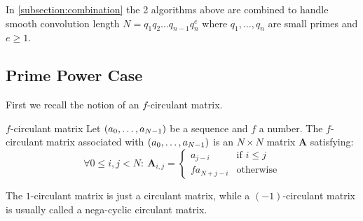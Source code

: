 In \cref{subsection:combination} the 2 algorithms above are combined to handle smooth convolution length \(N = q_1 q_2 \ldots q_{n-1} q_n^e\) where \(q_1, \ldots, q_n\) are small primes and \(e \ge 1\).

\subsection{Prime Power Case} \label{subsection:primePower}
First we recall the notion of an \(f\)-circulant matrix.
\begin{definition}{\(f\)-circulant matrix} \label{def:CircMat}
    Let \(\left({a}_0, \ldots, {a}_{N - 1}\right)\) be a sequence and \(f\) a number. The \(f\)-circulant matrix associated with \(\left({a}_0, \ldots, {a}_{N - 1}\right)\) is an \(N \times N\) matrix \(\bm{A}\) satisfying:
    \[\forall 0 \le i,j < N:\: \bm{A}_{i,j} = \begin{cases}
        a_{j - i} & \text{if \(i \le j\)} \\
        f a_{N+j-i} & \text{otherwise}
    \end{cases}\]
\end{definition}
The \(1\)-circulant matrix is just a circulant matrix, while a \((-1)\)-circulant matrix is usually called a nega-cyclic circulant matrix.

